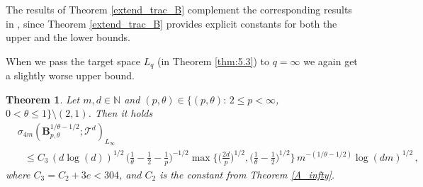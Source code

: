 \documentclass[11pt,reqno]{article}
\numberwithin{equation}{section}
\theoremstyle{definition}
\theoremstyle{plain}
\newtheorem{satz}{Theorem}[section]
\newcommand{\N}{\ensuremath{\mathbb{N}}}
\newcommand{\ca}{\ensuremath{\mathcal A}}
\begin{document}



The results of Theorem \ref{extend_trac_B} complement the corresponding results in \cite{Rom_I_92, Romanyuk_Izv_2003, StasUMZh_2016}, since Theorem \ref{extend_trac_B} provides explicit constants for both the upper and the lower bounds.



When we pass the target space $L_q$ (in Theorem \ref{thm:5.3}) to $q = \infty$ we again get a slightly worse upper bound.

\begin{satz} \label{besov}
 Let \(m,d \in \N\) and $(p,\theta)\in \{(p,\theta) : \, 2\leq p<\infty$, $0<\theta\leq 1\} \setminus (2,1)$. Then it holds
 \begin{equation}
  \begin{split}
     &\sigma_{4m}(\mathbf{B}^{1/\theta-1/2}_{p,\theta};\mathcal{T}^d)_{L_\infty}\\ 
     &~~~\leq C_3 \,(d\log(d))^{1/2}\, \Big(\frac{1}{\theta}-\frac{1}{2}-\frac{1}{p}\Big)^{-1/2}  \max\Big\{\Big(\frac{2d}{p}\Big)^{1/2}, \Big(\frac{1}{\theta}-\frac{1}{2}\Big)^{1/2}\Big\} \, m^{-(1/\theta-1/2)} \log(dm)^{1/2}\,,
   \end{split}
\end{equation}
where \(C_3 = C_2 + 3e < 304\), and \(C_2\) is the constant from Theorem \ref{A_infty}.
\end{satz}


\end{document}

